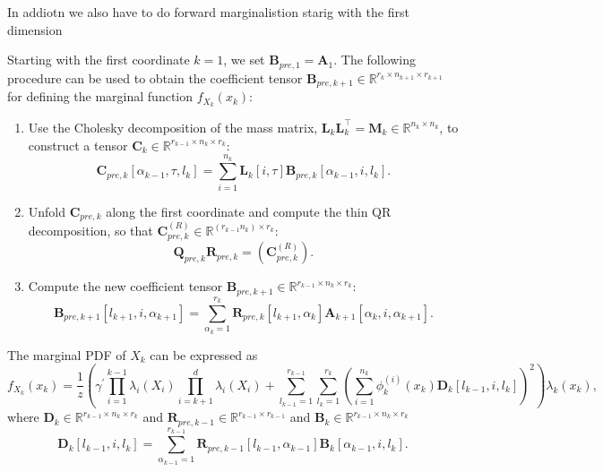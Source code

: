 In addiotn we also have to  do forward marginalistion starig with the first dimension
\begin{prop}
	Starting with the first coordinate $k = 1$, we set $\bm{B}_{pre,1} = \bm{A}_1$. The following procedure can be used to obtain the coefficient tensor $\bm{B}_{pre,k+1} \in \mathbb{R}^{r_{k} \times n_{k+1} \times r_{k+1}}$ for defining the marginal function $f_{X_k}(x_k)$:
	\begin{enumerate}
		\item Use the Cholesky decomposition of the mass matrix, $\bm{L}_k \bm{L}_k^\top = \bm{M}_k \in \mathbb{R}^{n_k \times n_k}$, to construct a tensor $\bm{C}_k \in \mathbb{R}^{r_{k-1} \times n_k \times r_k}$:
		\begin{equation}
			\bm{C}_{pre,k}[\alpha_{k-1}, \tau, l_k] = \sum_{i=1}^{n_k} \bm{L}_k[i, \tau] \bm{B}_{pre,k}[\alpha_{k-1}, i, l_k] .
		\end{equation}
		\item Unfold $\bm{C}_{pre,k}$ along the first coordinate and compute the thin QR decomposition, so that $\bm{C}_{pre,k}^{(R)} \in \mathbb{R}^{(r_{k-1} n_k ) \times r_k}$:
		\begin{equation}
			\bm{Q}_{pre,k}\bm{R}_{pre,k} = {(\bm{C}_{pre,k}^{(R)})}.
		\end{equation}
		\item Compute the new coefficient tensor $\bm{B}_{pre, k+1} \in \mathbb{R}^{r_{k-1} \times n_k \times r_k} $:
		\begin{equation}
			\bm{B}_{pre, k+1}[l_{k+1}, i, \alpha_{k+1}] = \sum_{\alpha_{k}=1}^{r_{k}} \bm{R}_{pre,k}[l_{k+1}, \alpha_{k}] \bm{A}_{k+1}[\alpha_{k}, i, \alpha_{k+1}] .
		\end{equation}
	\end{enumerate}
\end{prop}



The marginal PDF of $X_{k}$ can be expressed as
\begin{equation}
	f_{X_k}(x_k) = \frac{1}{z} \left(\gamma^{\prime} \prod_{i=1}^{k-1} \lambda_i(X_i) \prod_{i=k+1}^{d} \lambda_i(X_i) + \sum_{l_{k-1}=1}^{r_{k-1}} \sum_{l_k=1}^{r_k} \left(\sum_{i=1}^{n_k} \phi^{(i)}_k(x_k) \bm{D}_k[l_{k-1},i, l_k] \right)^2 \right) \lambda_k(x_k),
\end{equation}
where $\bm{D}_k \in \mathbb{R}^{r_{k-1} \times n_k \times r_k}$ and $\bm{R}_{pre,k-1}\in \mathbb{R}^{r_{k-1} \times r_{k-1}}$ and $\bm{B}_k \in \mathbb{R}^{r_{k-1} \times n_k \times r_k}$
\begin{equation}
	\bm{D}_k[l_{k-1},i,l_k] = \sum_{\alpha_{k-1}=1}^{r_{k-1}}  \bm{R}_{pre,k-1}[l_{k-1}, \alpha_{k-1}] \bm{B}_k[\alpha_{k-1}, i, l_k].
\end{equation}


